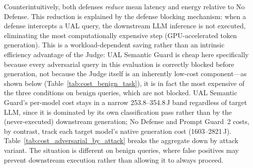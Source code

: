 Counterintuitively, both defenses \emph{reduce} mean latency and energy relative to No Defense. This reduction is explained by the defense blocking mechanism: when a defense intercepts a UAL query, the downstream LLM inference is not executed, eliminating the most computationally expensive step (GPU-accelerated token generation). This is a workload-dependent saving rather than an intrinsic efficiency advantage of the Judge: UAL Semantic Guard is cheap here specifically because every adversarial query in this evaluation is correctly blocked before generation, not because the Judge itself is an inherently low-cost component---as shown below (Table~\ref{tab:cost_benign_task}), it is in fact the most expensive of the three conditions on benign queries, which are not blocked. UAL Semantic Guard's per-model cost stays in a narrow 253.8--354.8\,J band regardless of target LLM, since it is dominated by its own classification pass rather than by the (never-executed) downstream generation; No Defense and Prompt Guard~2 costs, by contrast, track each target model's native generation cost (1603--2821\,J). Table~\ref{tab:cost_adversarial_by_attack} breaks the aggregate down by attack variant. The situation is different on benign queries, where false positives may prevent downstream execution rather than allowing it to always proceed.

